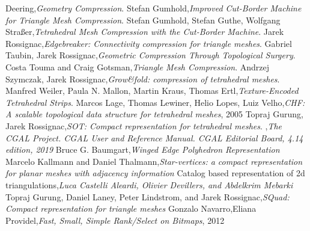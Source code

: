 \documentclass[a4paper,11pt,openany]{article}
\begin{document}
\begin{thebibliography}{999}
Deering,\emph{Geometry Compression}. 
Stefan Gumhold,\emph{Improved Cut-Border Machine for Triangle Mesh Compression}. 
Stefan Gumhold, Stefan Guthe, Wolfgang Straßer,\emph{Tetrahedral Mesh Compression with the Cut-Border Machine}. 
Jarek Rossignac,\emph{Edgebreaker: Connectivity compression for triangle meshes}. 
Gabriel Taubin, Jarek Rossignac,\emph{Geometric Compression Through Topological Surgery}. 
Costa Touma and Craig Gotsman,\emph{Triangle Mesh Compression}. 
Andrzej Szymczak, Jarek Rossignac,\emph{Grow\&fold: compression of tetrahedral meshes}. 
Manfred Weiler, Paula N. Mallon, Martin Kraus, Thomas Ertl,\emph{Texture-Encoded Tetrahedral Strips}. 
Marcos Lage, Thomas Lewiner, Helio Lopes, Luiz Velho,\emph{CHF: A scalable topological data structure for tetrahedral meshes}, 2005
Topraj Gurung, Jarek Rossignac,\emph{SOT: Compact representation for tetrahedral meshes}. 
,\emph{The CGAL Project. CGAL User and Reference Manual. CGAL Editorial Board, 4.14 edition, 2019}
Bruce G. Baumgart,\emph{Winged Edge Polyhedron Representation}
Marcelo Kallmann and Daniel Thalmann,\emph{Star-vertices: a compact representation for planar meshes with adjacency information}
Catalog based representation of 2d triangulations,\emph{Luca Castelli Aleardi, Olivier Devillers, and Abdelkrim Mebarki}
Topraj Gurung, Daniel Laney, Peter Lindstrom, and Jarek Rossignac,\emph{SQuad: Compact representation for triangle meshes}
Gonzalo Navarro,Eliana Providel,\emph{Fast, Small, Simple Rank/Select on Bitmaps}, 2012
\end{thebibliography}
\end{document}

